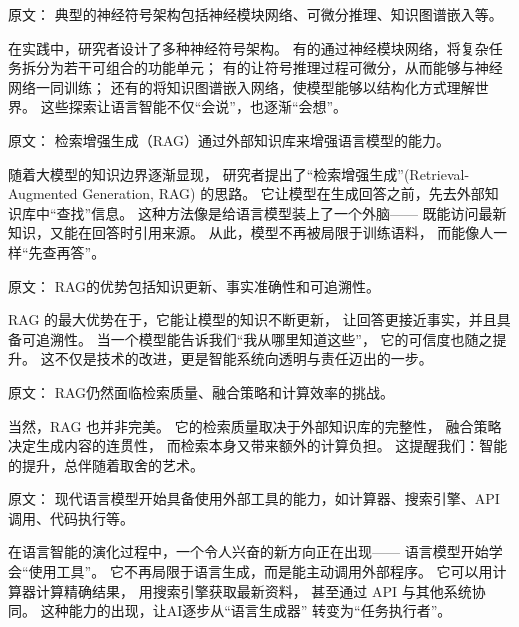 原文：
典型的神经符号架构包括神经模块网络、可微分推理、知识图谱嵌入等。  

在实践中，研究者设计了多种神经符号架构。  
有的通过神经模块网络，将复杂任务拆分为若干可组合的功能单元；  
有的让符号推理过程可微分，从而能够与神经网络一同训练；  
还有的将知识图谱嵌入网络，使模型能够以结构化方式理解世界。  
这些探索让语言智能不仅“会说”，也逐渐“会想”。  



原文：
检索增强生成（RAG）通过外部知识库来增强语言模型的能力。  

随着大模型的知识边界逐渐显现，  
研究者提出了“检索增强生成”(Retrieval-Augmented Generation, RAG) 的思路。  
它让模型在生成回答之前，先去外部知识库中“查找”信息。  
这种方法像是给语言模型装上了一个外脑——  
既能访问最新知识，又能在回答时引用来源。  
从此，模型不再被局限于训练语料，  
而能像人一样“先查再答”。  



原文：
RAG的优势包括知识更新、事实准确性和可追溯性。  

RAG 的最大优势在于，它能让模型的知识不断更新，  
让回答更接近事实，并且具备可追溯性。  
当一个模型能告诉我们“我从哪里知道这些”，  
它的可信度也随之提升。  
这不仅是技术的改进，更是智能系统向透明与责任迈出的一步。  



原文：
RAG仍然面临检索质量、融合策略和计算效率的挑战。  

当然，RAG 也并非完美。  
它的检索质量取决于外部知识库的完整性，  
融合策略决定生成内容的连贯性，  
而检索本身又带来额外的计算负担。  
这提醒我们：智能的提升，总伴随着取舍的艺术。  



原文：
现代语言模型开始具备使用外部工具的能力，如计算器、搜索引擎、API调用、代码执行等。  

在语言智能的演化过程中，一个令人兴奋的新方向正在出现——  
语言模型开始学会“使用工具”。  
它不再局限于语言生成，而是能主动调用外部程序。  
它可以用计算器计算精确结果，  
用搜索引擎获取最新资料，  
甚至通过 API 与其他系统协同。  
这种能力的出现，让AI逐步从“语言生成器”  
转变为“任务执行者”。  



